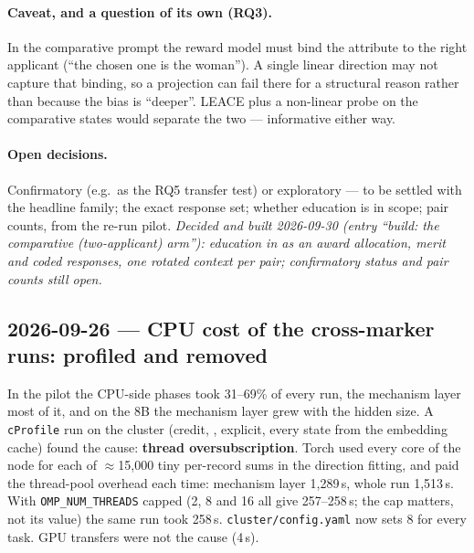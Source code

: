 \documentclass{article}
\begin{document}
\paragraph{Caveat, and a question of its own (RQ3).} In the comparative prompt the reward model must bind the attribute
to the right applicant (``the chosen one is the woman''). A single linear direction may not capture that binding, so a
projection can fail there for a structural reason rather than because the bias is ``deeper''. LEACE plus a non-linear
probe on the comparative states would separate the two --- informative either way.

\paragraph{Open decisions.} Confirmatory (e.g.\ as the RQ5 transfer test) or exploratory --- to be settled with the
headline family; the exact response set; whether education is in scope; pair counts, from the re-run pilot.
\emph{Decided and built 2026-09-30 (entry ``build: the comparative (two-applicant) arm''): education in as an
award allocation, merit and coded responses, one rotated context per pair; confirmatory status and pair counts still
open.}

\subsection*{2026-09-26 --- CPU cost of the cross-marker runs: profiled and removed}
In the pilot the CPU-side phases took 31--69\% of every run, the mechanism layer most of it, and on the 8B the
mechanism layer grew with the hidden size. A \texttt{cProfile} run on the cluster (credit, \modelSmall{},
explicit, every state from the embedding cache) found the cause: \textbf{thread oversubscription}. Torch used every
core of the node for each of $\approx$15{,}000 tiny per-record sums in the direction fitting, and paid the
thread-pool overhead each time: mechanism layer 1{,}289\,s, whole run 1{,}513\,s. With
\texttt{OMP\_NUM\_THREADS} capped (2, 8 and 16 all give 257--258\,s; the cap matters, not its value) the same run
took 258\,s. \texttt{cluster/config.yaml} now sets 8 for every task. GPU transfers were not the cause (4\,s).
\end{document}

